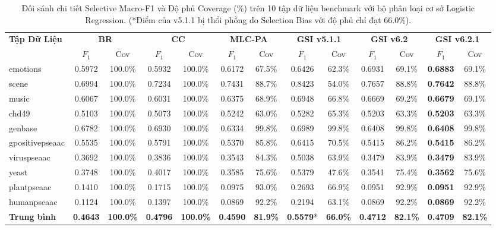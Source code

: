 \documentclass[10pt,a4paper,twoside]{article}
\begin{document}
\begin{table}[H]
\centering
\footnotesize
\setlength{\tabcolsep}{2.2pt}
\caption{Đối sánh chi tiết Selective Macro-F1 và Độ phủ Coverage (\%) trên 10 tập dữ liệu benchmark với bộ phân loại cơ sở Logistic Regression. (*Điểm của v5.1.1 bị thổi phồng do Selection Bias với độ phủ chỉ đạt 66.0\%).}
\label{tab:logistic_detail}
\vspace{0.4em}
\begin{tabular*}{\textwidth}{@{\extracolsep{\fill}}lcccccccccccc@{}}
\toprule
\multirow{2}{*}{\textbf{Tập Dữ Liệu}} & \multicolumn{2}{c}{\textbf{BR}} & \multicolumn{2}{c}{\textbf{CC}} & \multicolumn{2}{c}{\textbf{MLC-PA}} & \multicolumn{2}{c}{\textbf{GSI v5.1.1}} & \multicolumn{2}{c}{\textbf{GSI v6.2}} & \multicolumn{2}{c}{\textbf{GSI v6.2.1}} \\
\cmidrule(lr){2-3} \cmidrule(lr){4-5} \cmidrule(lr){6-7} \cmidrule(lr){8-9} \cmidrule(lr){10-11} \cmidrule(lr){12-13}
& $F_1$ & Cov & $F_1$ & Cov & $F_1$ & Cov & $F_1$ & Cov & $F_1$ & Cov & $F_1$ & Cov \\
\midrule
emotions & 0.5972 & 100.0\% & 0.5932 & 100.0\% & 0.6172 & 67.5\% & 0.6426 & 62.3\% & 0.6931 & 69.1\% & \textbf{0.6883} & 69.1\% \\
scene & 0.6994 & 100.0\% & 0.7234 & 100.0\% & 0.7431 & 88.7\% & 0.8423 & 54.0\% & 0.7657 & 88.8\% & \textbf{0.7642} & 88.8\% \\
music & 0.6067 & 100.0\% & 0.6031 & 100.0\% & 0.6375 & 68.9\% & 0.6948 & 66.8\% & 0.6669 & 69.2\% & \textbf{0.6679} & 69.1\% \\
chd49 & 0.5103 & 100.0\% & 0.5073 & 100.0\% & 0.5242 & 63.0\% & 0.5282 & 65.3\% & 0.5203 & 63.3\% & \textbf{0.5203} & 63.3\% \\
genbase & 0.6782 & 100.0\% & 0.6930 & 100.0\% & 0.6334 & 99.8\% & 0.6989 & 99.8\% & 0.6408 & 99.8\% & \textbf{0.6408} & 99.8\% \\
gpositivepseaac & 0.5535 & 100.0\% & 0.5791 & 100.0\% & 0.5370 & 85.8\% & 0.6415 & 70.5\% & 0.5415 & 86.2\% & \textbf{0.5415} & 86.2\% \\
viruspseaac & 0.3692 & 100.0\% & 0.3836 & 100.0\% & 0.3543 & 84.3\% & 0.5038 & 63.9\% & 0.3479 & 83.9\% & \textbf{0.3479} & 83.9\% \\
yeast & 0.3748 & 100.0\% & 0.4017 & 100.0\% & 0.3585 & 75.6\% & 0.5379 & 47.6\% & 0.3541 & 75.4\% & \textbf{0.3562} & 75.6\% \\
plantpseaac & 0.1410 & 100.0\% & 0.1715 & 100.0\% & 0.0975 & 93.0\% & 0.2693 & 66.9\% & 0.0951 & 92.9\% & \textbf{0.0951} & 92.9\% \\
humanpseaac & 0.1124 & 100.0\% & 0.1397 & 100.0\% & 0.0869 & 92.2\% & 0.2194 & 63.1\% & 0.0869 & 92.2\% & \textbf{0.0869} & 92.2\% \\
\midrule
\textbf{Trung bình} & \textbf{0.4643} & \textbf{100.0\%} & \textbf{0.4796} & \textbf{100.0\%} & \textbf{0.4590} & \textbf{81.9\%} & \textbf{0.5579}* & \textbf{66.0\%} & \textbf{0.4712} & \textbf{82.1\%} & \textbf{0.4709} & \textbf{82.1\%} \\
\bottomrule
\end{tabular*}
\end{table}
\end{document}
